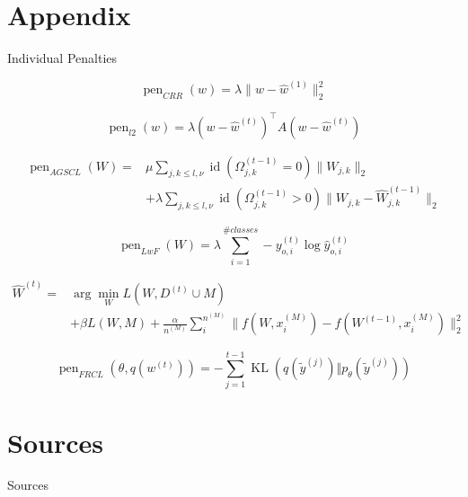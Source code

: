 \documentclass{beamer}
\DeclareMathOperator{\pen}{pen}
\DeclareMathOperator{\id}{id}
\DeclareMathOperator{\kl}{KL}
\begin{document}
\section{Appendix}
\begin{frame}{Individual Penalties}
	
	\begin{equation}
		\pen_{CRR}(w) = \lambda\lVert w - \hat{w}^{(1)}\rVert_2^2
	\end{equation}
	
	\begin{equation}
		\pen_{l2}(w) = \lambda (w - \hat{w}^{(t)})^\top A (w - \hat{w}^{(t)})
	\end{equation}
	
	\begin{equation}
		\begin{split}
			\pen_{AGSCL}(W)= &\mu\sum_{j,k \leq l,\nu} \id(\Omega_{j,k}^{(t-1)} = 0)\lVert W_{j,k} \rVert_2 \\
			&+ \lambda \sum_{j,k \leq l,\nu} \id(\Omega_{j,k}^{(t-1)} > 0)\lVert W_{j,k} - \hat{W}_{j,k}^{(t-1)}\rVert_2
		\end{split}
	\end{equation}
	
	\begin{equation}
		\pen_{LwF}(W) = \lambda \sum_{i = 1}^{\#classes}-y_{o,i}^{(t)} \log \hat{y}_{o,i}^{(t)}
	\end{equation}
	
	\begin{equation}
		\begin{split}
		\hat{W}^{(t)} = &\arg\min_{W} L(W, D^{(t)} \cup M)\\
			&+ \beta L(W, M) + \frac{\alpha}{n^{(M)}}\sum_{i}^{n^{(M)}}\lVert f(W, x_i^{(M)}) - f(W^{(t-1)}, x_i^{(M)}) \rVert_2^2
		\end{split}
	\end{equation}
	
	\begin{equation}
		\pen_{FRCL}(\theta, q(w^{(t)})) = - \sum_{j=1}^{t-1}\kl(q(\tilde{y}^{(j)})\Vert p_\theta(\tilde{y}^{(j)}))
	\end{equation}
	
\end{frame}

\section*{Sources}
\begin{frame}{Sources}
	\small
	
	
\end{frame}
\end{document}
